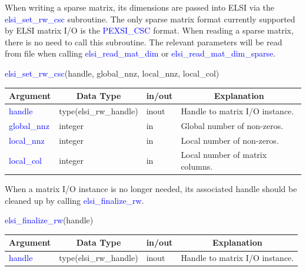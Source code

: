 \documentclass{report}
\begin{document}
\bigskip
When writing a sparse matrix, its dimensions are passed into ELSI via the \textcolor{blue}{elsi\_set\_rw\_csc} subroutine.  The only sparse matrix format currently supported by ELSI matrix I/O is the \textcolor{blue}{PEXSI\_CSC} format.  When reading a sparse matrix, there is no need to call this subroutine.  The relevant parameters will be read from file when calling \textcolor{blue}{elsi\_read\_mat\_dim} or \textcolor{blue}{elsi\_read\_mat\_dim\_sparse}.\\

\begin{labeling}{\hspace{6cm}}
\item [\hspace{0.3cm} \textcolor{blue}{elsi\_set\_rw\_csc}(handle, global\_nnz, local\_nnz, local\_col)]
\end{labeling}

\begin{tabular}[]{|p{20mm}|p{45mm}|p{15mm}|p{85mm}|}
\hline
\multicolumn{1}{|c|}{\textbf{Argument}} & \multicolumn{1}{c|}{\textbf{Data Type}} & \multicolumn{1}{c|}{\textbf{in/out}} & \multicolumn{1}{c|}{\textbf{Explanation}}\\
\hline
\textcolor{blue}{handle}      & type(elsi\_rw\_handle) & inout & Handle to matrix I/O instance.\\
\hline
\textcolor{blue}{global\_nnz} & integer                & in    & Global number of non-zeros.\\
\hline
\textcolor{blue}{local\_nnz}  & integer                & in    & Local number of non-zeros.\\
\hline
\textcolor{blue}{local\_col}  & integer                & in    & Local number of matrix columns.\\
\hline
\end{tabular}

\bigskip
When a matrix I/O instance is no longer needed, its associated handle should be cleaned up by calling \textcolor{blue}{elsi\_finalize\_rw}.\\

\begin{labeling}{\hspace{6cm}}
\item [\hspace{0.3cm} \textcolor{blue}{elsi\_finalize\_rw}(handle)]
\end{labeling}

\begin{tabular}[]{|p{20mm}|p{45mm}|p{15mm}|p{85mm}|}
\hline
\multicolumn{1}{|c|}{\textbf{Argument}} & \multicolumn{1}{c|}{\textbf{Data Type}} & \multicolumn{1}{c|}{\textbf{in/out}} & \multicolumn{1}{c|}{\textbf{Explanation}}\\
\hline
\textcolor{blue}{handle}      & type(elsi\_rw\_handle) & inout & Handle to matrix I/O instance.\\
\hline
\end{tabular}
\end{document}
